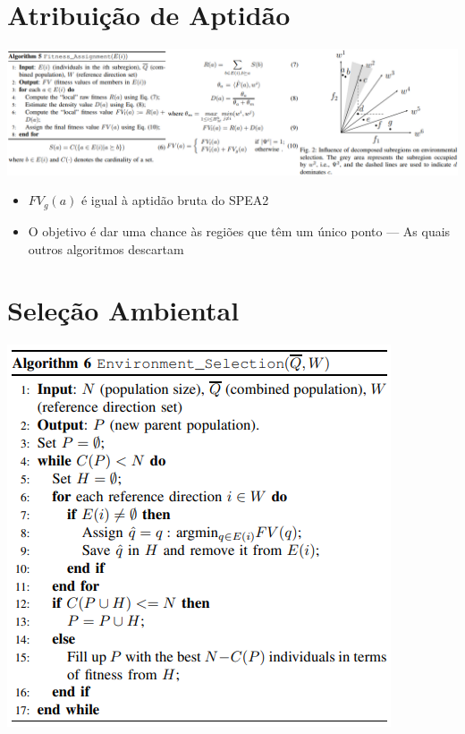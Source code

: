\documentclass{rbfin}
\begin{document}
\newpage
\section{Atribuição de Aptidão}

\vspace{6mm}

\begin{center}
\includegraphics[scale=1.125]{alg5}
\end{center}

\begin{itemize}
  \item $FV_g(a)$ é igual à aptidão bruta do SPEA2
  \item O objetivo é dar uma chance às regiões que têm um único ponto --- As quais outros algoritmos descartam
\end{itemize}

\newpage
\section{Seleção Ambiental}

\vspace{6mm}

\begin{center}
\includegraphics[scale=1]{alg6}
\end{center}
\end{document}
